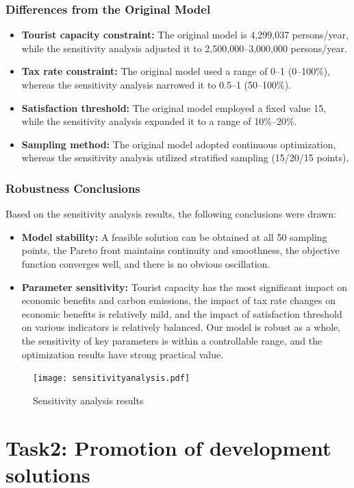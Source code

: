 \documentclass{mcmthesis}
\begin{document}
\subsubsection{Differences from the Original Model}
\begin{itemize}
  \item \textbf{Tourist capacity constraint:} The original model is 4,299,037 persons/year, while the sensitivity analysis adjusted it to 2,500,000–3,000,000 persons/year.
  \item \textbf{Tax rate constraint:} The original model used a range of 0–1 (0–100\%), whereas the sensitivity analysis narrowed it to 0.5–1 (50–100\%).
  \item \textbf{Satisfaction threshold:} The original model employed a fixed value 15, while the sensitivity analysis expanded it to a range of 10\%–20\%.
  \item \textbf{Sampling method:} The original model adopted continuous optimization, whereas the sensitivity analysis utilized stratified sampling (15/20/15 points).
\end{itemize}
\subsubsection{Robustness Conclusions}
Based on the sensitivity analysis results, the following conclusions were drawn:
\begin{itemize}
  \item \textbf{Model stability:} A feasible solution can be obtained at all 50 sampling points, the Pareto front maintains continuity and smoothness, the objective function converges well, and there is no obvious oscillation.
  \item \textbf{Parameter sensitivity:} Tourist capacity has the most significant impact on economic benefits and carbon emissions, the impact of tax rate changes on economic benefits is relatively mild, and the impact of satisfaction threshold on various indicators is relatively balanced. Our model is robust as a whole, the sensitivity of key parameters is within a controllable range, and the optimization results have strong practical value.
\end{itemize}
\begin{figure}
  \centering
  \texttt{[image: sensitivityanalysis.pdf]}
  \caption{Sensitivity analysis results}
  \label{fig:sensitivity}
\end{figure}
\section{Task2: Promotion of development solutions}
\end{document}
